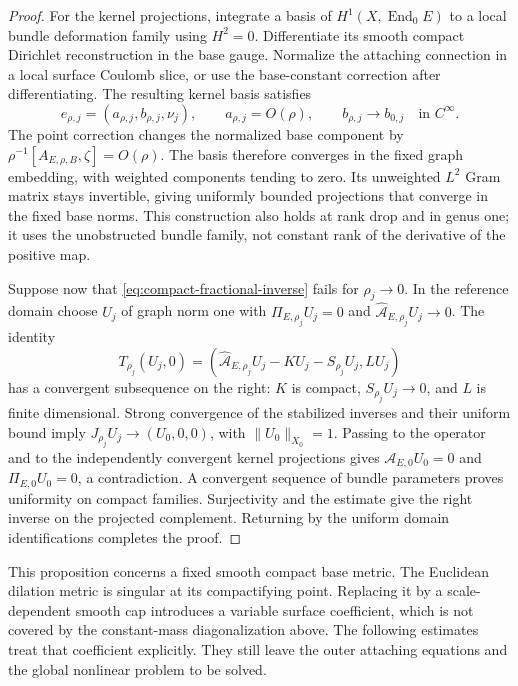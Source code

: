 \documentclass[11pt]{amsart}
\theoremstyle{definition}
\theoremstyle{remark}
\theoremstyle{plain}
\newcommand{\End}{\operatorname{End}}
\begin{document}
\begin{proof}
For the kernel projections, integrate a basis of $H^1(X,\End_0E)$
to a local bundle deformation family using $H^2=0$. Differentiate
its smooth compact Dirichlet reconstruction in the base gauge.
Normalize the attaching connection in a local surface Coulomb
slice, or use the base-constant correction after differentiating.
The resulting kernel basis satisfies
\begin{equation}\label{eq:compact-kernel-basis-limit}
 e_{\rho,j}=(a_{\rho,j},b_{\rho,j},\nu_j),\qquad
 a_{\rho,j}=O(\rho),\qquad b_{\rho,j}\longrightarrow b_{0,j}
                         \quad\text{in }C^\infty.
\end{equation}
The point correction changes the normalized base component by
$\rho^{-1}[A_{E,\rho,B},\zeta]=O(\rho)$. The basis therefore
converges in the fixed graph embedding, with weighted components
tending to zero. Its unweighted $L^2$ Gram matrix stays invertible,
giving uniformly bounded projections that converge in the fixed
base norms. This construction also holds at rank drop and in
genus one; it uses the unobstructed bundle family, not constant
rank of the derivative of the positive map.

Suppose now that \eqref{eq:compact-fractional-inverse} fails for
$\rho_j\to0$. In the reference domain choose $U_j$ of graph norm
one with $\Pi_{E,\rho_j}U_j=0$ and
$\widehat{\mathcal A}_{E,\rho_j}U_j\to0$. The identity
\[
 T_{\rho_j}(U_j,0)=
 (\widehat{\mathcal A}_{E,\rho_j}U_j-KU_j-S_{\rho_j}U_j,LU_j)
\]
has a convergent subsequence on the right: $K$ is compact,
$S_{\rho_j}U_j\to0$, and $L$ is finite dimensional. Strong
convergence of the stabilized inverses and their uniform bound
imply $J_{\rho_j}U_j\to(U_0,0,0)$, with $\|U_0\|_{X_0}=1$.
Passing to the operator and to the independently convergent kernel
projections gives $\mathcal A_{E,0}U_0=0$ and $\Pi_{E,0}U_0=0$,
a contradiction. A convergent sequence of bundle parameters proves
uniformity on compact families. Surjectivity and the estimate give
the right inverse on the projected complement. Returning by the
uniform domain identifications completes the proof.
\end{proof}

This proposition concerns a fixed smooth compact base metric.
The Euclidean dilation metric is singular at its compactifying
point. Replacing it by a scale-dependent smooth cap introduces a
variable surface coefficient, which is not covered by the
constant-mass diagonalization above. The following estimates treat
that coefficient explicitly. They still leave the outer attaching
equations and the global nonlinear problem to be solved.
\end{document}
